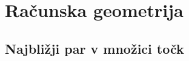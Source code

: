 \documentclass[10pt,a4paper,oneside]{book}
\begin{document}

\chapter{Računska geometrija}
\section{Najbližji par v množici točk}

%

\end{document}

